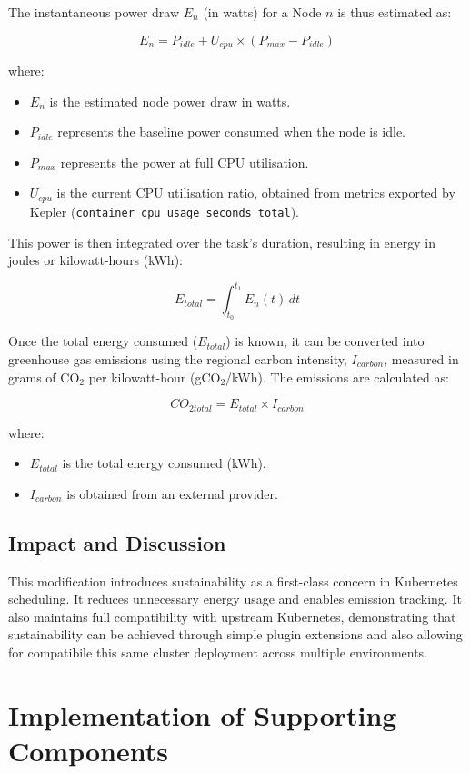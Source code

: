 \documentclass{article}
\begin{document}
The instantaneous power draw $E_n$ (in watts) for a Node $n$ is thus estimated as:

\[
E_n = P_{idle} + U_{cpu} \times (P_{max} - P_{idle})
\]

where:
\begin{itemize}
  \item $E_n$ is the estimated node power draw in watts.
  \item $P_{idle}$ represents the baseline power consumed when the node is idle.
  \item $P_{max}$ represents the power at full CPU utilisation.
  \item $U_{cpu}$ is the current CPU utilisation ratio, obtained from metrics exported by Kepler (\texttt{container\_cpu\_usage\_seconds\_total}).\cite{kepler}
\end{itemize}

This power is then integrated over the task's duration, resulting in energy in joules or kilowatt-hours (kWh):

\[
E_{total} = \int_{t_0}^{t_1} E_n(t) \, dt
\]

Once the total energy consumed ($E_{total}$) is known, it can be converted into greenhouse gas emissions using the regional carbon intensity, $I_{carbon}$, measured in grams of CO$_2$ per kilowatt-hour (gCO$_2$/kWh).  
The emissions are calculated as:

\[
CO_{2total} = E_{total} \times I_{carbon}
\]

where:
\begin{itemize}
  \item $E_{total}$ is the total energy consumed (kWh).
  \item $I_{carbon}$ is obtained from an external provider.
\end{itemize}


\subsection{Impact and Discussion}

This modification introduces sustainability as a first-class concern in Kubernetes scheduling.  
It reduces unnecessary energy usage and enables emission tracking.
It also maintains full compatibility with upstream Kubernetes, demonstrating that sustainability 
can be achieved through simple plugin extensions and also allowing for 
compatibile this same cluster deployment across multiple environments.

\section{Implementation of Supporting Components}
\end{document}
